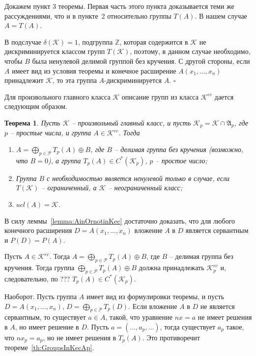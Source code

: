 \documentclass[12pt]{extarticle} %
\newtheorem{theorem}{Теорема}[section]
\def\proof{{\noindent{\bf Доказательство.}} }
\def\A{{\mathfrak{A}}}
\def\K{{\mathcal{K}}}
\def\Kec{\mathcal{K}^{ec}}
\def\P{{\mathcal{P}}}
\def\Z{{\mathbb{Z}}}
\begin{document}
Докажем пункт 3 теоремы. Первая часть этого пункта доказывается теми же рассуждениями, что и в пункте~2 относительно группы $T(A)$. В нашем случае $A = T(A)$.

В подслучае $\delta(\K) = 1$, подгруппа $\Z$, которая содержится в $\K$ не дискриминируется классом групп $T(\K)$, поэтому, в данном случае необходимо, чтобы $B$ была ненулевой делимой группой без кручения. С другой стороны, если $A$ имеет вид из условия теоремы и конечное расширение $A(x_1, \ldots, x_n)$ принадлежит $\K$, то эта группа $A$-дискриминируется $A$. $\square$


Для произвольного главного класса $\K$ описание групп из класса $\Kec$ дается следующим образом.

\begin{theorem}\label{th:GroupInKecAny}
Пусть $\K$ -- произвольный главный класс, и пусть $\K_p = \K \cap \A_p$, где $p$ -- простые числа, и группа $A \in \Kec$. Тогда
\begin{enumerate}
\item $A = \bigoplus\limits_{p \in \P} T_p(A) \oplus B$, где $B$ -- делимая группа без кручения (возможно, что $B = 0$), а группа $T_p(A) \in C^*(\K_p)$, $p$ -- простое число;

\item Группа $B$ с необходимостью является ненулевой только в случае, если $T(\K)$ -- ограниченный, а $\K$ -- неограниченный класс;

\item $ucl(A) = \K$.
\end{enumerate}
\end{theorem}

\proof В силу леммы~\ref{lemma:AinOrnotinKec} достаточно доказать, что для любого конечного расширения $D = A(x_1, \ldots, x_n)$ вложение $A$ в $D$ является сервантным и $P(D) = P(A)$.

Пусть $A \in \Kec$. Тогда $A = \bigoplus\limits_{p \in \P} T_p(A) \oplus B$, где $B$ -- делимая группа без кручения. Тогда группа $\bigoplus\limits_{p \in \P} T_p(A) \oplus B$ должна принадлежать $\Kec_p$ и, следовательно, по ???  $T_p(A) \in C^*(\K_p)$.

Наоборот. Пусть группа $A$ имеет вид из формулировки теоремы, и пусть $D = A(x_1, \ldots, x_n)$, $D = \bigoplus\limits_{p \in \P} T_p(D)$. Если вложение $A$ в $D$ не является сервантным, то существует $a \in A$, такой, что уравнение $nx = a$ не имеет решения в $A$, но имеет решение в $D$. Пусть $a = (\ldots, a_p, \ldots)$, тогда существует $a_p$ такое, что $n x_p = a_p$, но не имеет решения в $T_p(A)$. Это противоречит теореме~\ref{th:GroupsInKecAp}.
\end{document}
